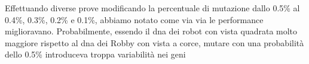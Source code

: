 Effettuando diverse prove modificando la percentuale di mutazione dallo 0.5\%
al 0.4\%, 0.3\%, 0.2\% e 0.1\%, abbiamo notato come via via le performance
miglioravano. Probabilmente, essendo il dna dei robot con vista quadrata molto
maggiore rispetto al dna dei Robby con vista a corce, mutare con una probabilità
dello 0.5\% introduceva troppa variabilità nei geni 

\clearpage
